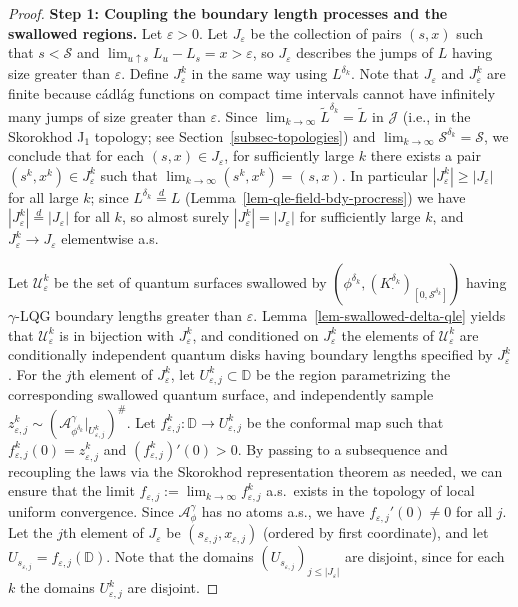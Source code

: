 \documentclass[a4paper]{article}
\numberwithin{equation}{section}
\def\eps{\varepsilon}
\newcommand{\D}{\mathbb{D}}
\newcommand{\cA}{\mathcal{A}}
\newcommand{\qduration}{\mathcal{S}}
\theoremstyle{remark}
\numberwithin{equation}{section}
\begin{document}
\begin{proof}


\medskip \noindent
\textbf{Step 1: Coupling the boundary length processes and the swallowed regions.} 
Let $\eps > 0$. 
Let $J_\eps$ be the collection of pairs $(s,x)$ such that $s < \qduration$ and $\lim_{u \uparrow s} L_u - L_s = x > \eps$, so $J_\eps$ describes the jumps of $L$ having size greater than $\eps$. Define $J_\eps^k$ in the same way using $L^{\delta_k}$. Note that $J_\eps$ and $J_\eps^k$ are finite because c\'adl\'ag functions on compact time intervals cannot have infinitely many jumps of size greater than $\eps$. 
Since $\lim_{ k \to \infty} \tilde L^{\delta_k} = \tilde L$ in $\mathcal J$ (i.e., in the Skorokhod J$_1$ topology; see Section~\ref{subsec-topologies}) and $\lim_{k \to \infty} \qduration^{\delta_k} = \qduration$, we conclude that for each $(s, x) \in J_\eps$, for sufficiently large $k$ there exists a pair $(s^k, x^k) \in J_\eps^k$ such that $\lim_{k \to \infty} (s^k, x^k) = (s,x)$. In particular $|J_\eps^k| \geq |J_\eps|$ for all large $k$; since $L^{\delta_k} \stackrel d= L$ (Lemma~\ref{lem-qle-field-bdy-procress}) we have $|J_\eps^k| \stackrel d=  |J_\eps|$ for all $k$, so  almost surely $|J_\eps^k| = |J_\eps|$ for sufficiently large $k$, and $J_\eps^k \to J_\eps$ elementwise a.s. 

Let $\mathcal U^k_\eps$ be the set of quantum surfaces swallowed by $(\phi^{\delta_k}, (K^{\delta_k}_\cdot)_{[0,\qduration^{\delta_k}]})$ having $\gamma$-LQG boundary lengths greater than $\eps$. Lemma~\ref{lem-swallowed-delta-qle} yields that $\mathcal U^k_\eps$ is in bijection with $J_\eps^k$, and conditioned on $J_\eps^k$ the elements of $\mathcal U^k_\eps$ are conditionally independent quantum disks having boundary lengths specified by $J_\eps^k$. For the $j$th element of $J_\eps^k$, let $U^k_{\eps,j} \subset \D$ be the region parametrizing the corresponding swallowed quantum surface, and independently sample $z^k_{\eps,j} \sim (\cA^\gamma_{\phi^{\delta_k}}|_{U^k_{\eps,j}})^\#$. Let $f^k_{\eps,j} : \D \to U^k_{\eps,j}$ be the conformal map such that $f^k_{\eps,j}(0) = z^k_{\eps,j}$ and $(f^k_{\eps,j})'(0) > 0$. By passing to a subsequence and recoupling the laws via the Skorokhod representation theorem as needed, we can ensure that the limit $f_{\eps,j} := \lim_{k \to \infty} f^k_{\eps,j}$ a.s.\ exists in the topology of local uniform convergence. Since $\cA^\gamma_\phi$ has no atoms a.s., we have $f_{\eps,j}'(0) \neq 0$ for all $j$. 
Let the $j$th element of $J_\eps$ be $(s_{\eps,j}, x_{\eps,j})$ (ordered by first coordinate), and let $U_{s_{\eps,j}} = f_{\eps,j} (\D)$. Note that the domains $(U_{s_{\eps, j}})_{ j \leq |J_\eps|}$ are disjoint, since for each $k$ the domains $U^k_{\eps, j}$ are disjoint.


\end{proof}
\end{document}
